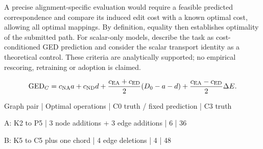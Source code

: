\documentclass[10pt]{article}
\begin{document}
A precise alignment-specific evaluation would require a feasible predicted correspondence and compare its induced edit cost with a known optimal cost, allowing all optimal mappings. By definition, equality then establishes optimality of the submitted path. For scalar-only models, describe the task as cost-conditioned GED prediction and consider the scalar transport identity as a theoretical control. These criteria are analytically supported; no empirical rescoring, retraining or adoption is claimed.\par
\[\operatorname{GED}_{C}=c_{\rm NA}a+c_{\rm ND}d+\frac{c_{\rm EA}+c_{\rm ED}}{2}(D_0-a-d)+\frac{c_{\rm EA}-c_{\rm ED}}{2}\Delta E.\]\par
Graph pair | Optimal operations | C0 truth / fixed prediction | C3 truth\par
A: K2 to P5 | 3 node additions + 3 edge additions | 6 | 36\par
B: K5 to C5 plus one chord | 4 edge deletions | 4 | 48\par
\end{document}
